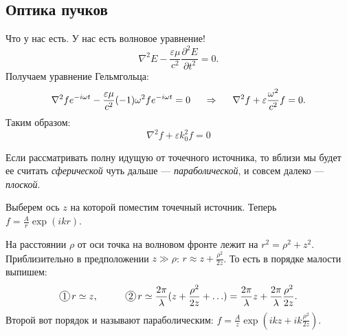  \subsection*{Оптика пучков}
 Что у нас есть. У нас есть волновое уравнение!
 \begin{equation*}
 	\nabla^2 E - \frac{\varepsilon \mu}{c^2} \frac{\partial^2 E}{\partial t^2} = 0.
 \end{equation*}
 Получаем уравнение Гельмгольца:
 \begin{equation*}
 	\nabla^2 f e^{- i \omega t} - \frac{\varepsilon \mu}{c^2} (-1) \omega^2 f e^{-i \omega t} = 0
 	\hspace{0.5 cm}
 	\Rightarrow
 	\hspace{0.5 cm}
 	\nabla^2 f + \varepsilon \frac{\omega^2}{c^2} f = 0.
 \end{equation*}
 Таким образом:
 \begin{equation}
 	\nabla^2 f + \varepsilon k_0^2 f = 0
 	\label{helmgoltz}
 \end{equation}

 Если рассматривать полну идущую от точечного источника, то вблизи мы будет ее считать \textit{сферической} чуть дальше --- \textit{параболической}, и совсем далеко --- \textit{плоской}.  

 Выберем ось $z$ на которой поместим точечный источник.
Теперь $f = \frac{A}{r} \exp(i k r)$.

На расстоянии $\rho$ от оси точка на волновом фронте лежит на $r^2 = \rho^2 + z^2$. Приблизительно в предположении $z \gg \rho$: $r \approx z + \frac{\rho^2}{2 z}$.
То есть в порядке малости выпишем:
\begin{equation*}
	\encircled{1} \, r \simeq z,
	\hspace{1 cm}
	\encircled{2} \, r \simeq \frac{2 \pi}{\lambda} (z + \frac{\rho^2}{2 z} + \ldots) = \frac{2\pi}{\lambda}z + \frac{2 \pi}{\lambda} \frac{\rho^2}{2 z}.
\end{equation*}
Второй вот порядок и называют параболическим: $f = \frac{A}{z} \exp(i k z + i k \frac{\rho^2}{2 z})$.

